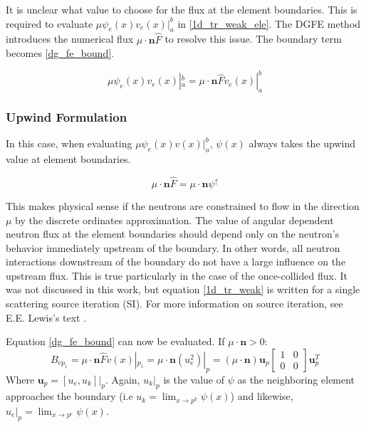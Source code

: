 It is unclear what value to choose for the flux at the element boundaries.  This is required to evaluate $\mu \psi_e(x) v_e(x)|_a^b$ in \ref{1d_tr_weak_ele}. The DGFE method introduces the numerical flux $\mu \cdot \mathbf n \hat{F} $ to resolve this issue.  The boundary term becomes \ref{dg_fe_bound}.

\begin{equation}
\mu \psi_e(x) v_e(x)|_a^b = \mu \cdot \mathbf n \hat{F}  v_e(x)|_a^b 
\label{dg_fe_bound}
\end{equation}

\subsubsection{Upwind Formulation}
In this case, when evaluating $\mu \psi_e(x) v(x)|_a^b$, $\psi(x)$ always takes the upwind value at element boundaries.

\begin{equation}
\mu \cdot \mathbf n \hat{F}  = \mu \cdot \mathbf n \psi^{\uparrow} 
\end{equation}

This makes physical sense if the neutrons are constrained to flow in the direction $\mu$ by the discrete ordinates approximation.  The value of angular dependent neutron flux at the element boundaries should depend only on the neutron's behavior immediately upstream of the boundary.  In other words, all neutron interactions downstream of the boundary do not have a large influence on the upstream flux.  This is true particularly in the case of the once-collided flux.  It was not discussed in this work, but equation \ref{1d_tr_weak} is written for a single scattering source iteration (SI).  For more information on source iteration, see E.E. Lewis's text \cite{Lewis}.

Equation \ref{dg_fe_bound} can now be evaluated.
If $\mu \cdot \mathbf n > 0$: 
\begin{equation}
B_{ep_1} = \mu \cdot \hat{\mathbf n} \hat{F}  v(x)|_{p_1} = 
\mu \cdot \mathbf n (u_e^2)|_p = 
(\mu \cdot \mathbf n) \mathbf u_p 
\begin{bmatrix}
    1      & 0 \\
    0      & 0 
\end{bmatrix}
\mathbf u_p^T
\end{equation}
Where $\mathbf u_p = [u_e, u_k]|_p$.  Again, $u_k|_p$ is the value of $\psi$ as the neighboring element approaches the boundary (i.e $u_k=\lim_{x \to p^k}\psi(x)$)  and likewise, $u_e|_p=\lim_{x \to p^e}\psi(x)$.

